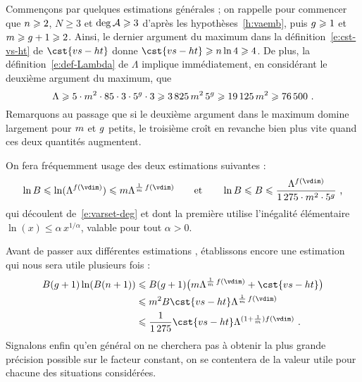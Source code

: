 Commençons par quelques estimations générales ; on rappelle pour commencer que
\( n \geqslant 2 \), \( N \ge 3 \) et \( \deg \mathcal A \geqslant 3 \) d'après les
hypothèses~\ref{h:vaemb}, puis \( g \geqslant 1 \) et \( m \geqslant g + 1
  \geqslant 2 \). Ainsi, le dernier argument du maximum dans la
définition~\eqref{e:cst-vs-ht} de \( \cst{vs-ht} \) donne
\( \cst{vs-ht} \ge \dimp \ln 4 \ge 4 \).
De plus, la définition~\eqref{e:def-Lambda} de \( \Lambda \) implique
immédiatement, en considérant le deuxième argument du maximum, que
\begin{equation}
  \Lambda
  \geqslant
  5 \cdot m^2 \cdot 85 \cdot 3 \cdot 5^g \cdot 3
  \geqslant
  3\,825 \, m^2 \, 5^g
  \geqslant
  19\,125 \, m^2
  \geqslant
  76\,500
  \text{ .}
\end{equation}
Remarquons au passage que si le deuxième argument dans le maximum domine
largement pour \( m \) et \( g \) petits, le troisième croît en
revanche bien plus vite quand ces deux quantités augmentent.

On fera fréquemment usage des deux estimations suivantes :
\begin{equation}
  \ln B
  \le
  \ln(\Lambda^{f(\vdim)})
  \le
  \puiss \Lambda^{\frac1\puiss\,f(\vdim)}
  \qquad\text{et}\qquad
  \ln B
  \le
  B
  \le
  \frac{ \Lambda^{f(\vdim)} }{ 1\,275 \cdot \puiss^2 \cdot 5^\genre }
  \pmm,
\end{equation}
qui découlent de~\eqref{e:varset-deg} et dont la première utilise l'inégalité
élémentaire \( \ln(x) \le \alpha \, x^{1/\alpha} \), valable pour tout
\( \alpha > 0 \).

Avant de passer aux différentes estimations , établissons encore
une estimation qui nous sera utile plusieurs fois :
\begin{align}
  B (\genre + 1) \ln (B (\dimp+1))
  & \le
  B (\genre + 1) \bigl(
    \puiss \Lambda^{\frac1\puiss\,f(\vdim)}
    + \cst{vs-ht}
  \bigr)
  \\ & \le
  \puiss^2 B \cst{vs-ht} \Lambda^{\frac1\puiss\,f(\vdim)}
  \\ & \le \label{e:adhoc-gen}
  \frac1{1\,275} \cst{vs-ht} \Lambda^{(1 + \frac1\puiss) f(\vdim)}
  \pmm.
\end{align}
Signalons enfin qu'en général on ne cherchera pas à obtenir la plus grande
précision possible sur le facteur constant, on se contentera de la valeur
utile pour chacune des situations considérées.

\medskip

